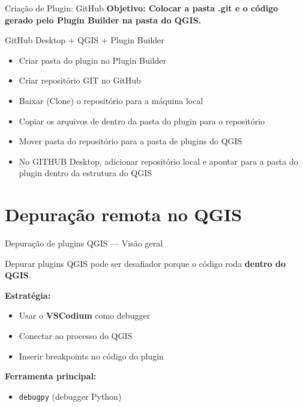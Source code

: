 \documentclass{beamer}
\begin{document}
\begin{frame}{Criação de Plugin: GitHub}
\textbf{Objetivo: Colocar a pasta .git e o código gerado pelo Plugin Builder na pasta do QGIS.}

\begin{center}
GitHub Desktop + QGIS + Plugin Builder
\end{center}
    \begin{itemize}
\item Criar pasta do plugin no Plugin Builder
\item Criar repositório GIT no GitHub
\item Baixar (Clone) o repositório para a máquina local
\item Copiar os arquivos de dentro da pasta do plugin para o repositório
\item Mover pasta do repositório para a pasta de plugins do QGIS
\item No GITHUB Desktop, adicionar repositório local e apontar para a pasta do plugin dentro da estrutura do QGIS
    \end{itemize}
\end{frame}

\section{Depuração remota no QGIS}

\begin{frame}{Depuração de plugins QGIS — Visão geral}
    
    Depurar plugins QGIS pode ser desafiador porque o código roda \textbf{dentro do QGIS}.
    
    \vspace{0.4cm}
    
    \textbf{Estratégia:}
    
    \begin{itemize}
        \item Usar o \textbf{VSCodium} como debugger
        \item Conectar ao processo do QGIS
        \item Inserir breakpoints no código do plugin
    \end{itemize}
    
    \vspace{0.4cm}
    
    \textbf{Ferramenta principal:}
    
    \begin{itemize}
        \item \texttt{debugpy} (debugger Python)
    \end{itemize}
    
\end{frame}
\end{document}

